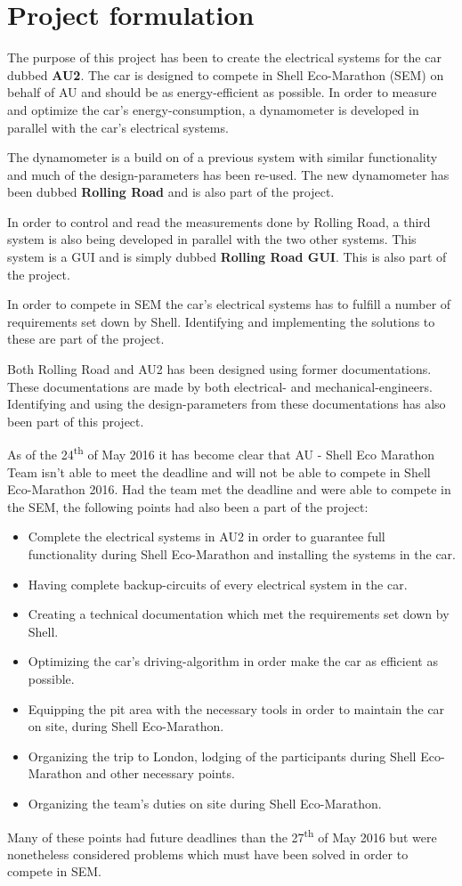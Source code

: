 \chapter{Project formulation}
The purpose of this project has been to create the electrical systems for the car dubbed \textbf{AU2}. The car is designed to compete in Shell Eco-Marathon (SEM) on behalf of AU and should be as energy-efficient as possible. In order to measure and optimize the car's energy-consumption, a dynamometer is developed in parallel with the car's electrical systems. 

The dynamometer is a build on of a previous system with similar functionality\cite{BAC_rullefelt} and much of the design-parameters has been re-used. The new dynamometer has been dubbed \textbf{Rolling Road} and is also part of the project.

In order to control and read the measurements done by Rolling Road, a third system is also being developed in parallel with the two other systems. This system is a GUI and is simply dubbed \textbf{Rolling Road GUI}. This is also part of the project.

In order to compete in SEM the car's electrical systems has to fulfill a number of requirements set down by Shell. Identifying and implementing the solutions to these are part of the project.

Both Rolling Road and AU2 has been designed using former documentations. These documentations are made by both electrical- and mechanical-engineers. Identifying and using the design-parameters from these documentations has also been part of this project.

As of the 24\textsuperscript{th} of May 2016 it has become clear that AU - Shell Eco Marathon Team isn't able to meet the deadline and will not be able to compete in Shell Eco-Marathon 2016. Had the team met the deadline and were able to compete in the SEM, the following points had also been a part of the project:
\begin{itemize}
	\item Complete the electrical systems in AU2 in order to guarantee full functionality during Shell Eco-Marathon and installing the systems in the car.
	\item Having complete backup-circuits of every electrical system in the car.
	\item Creating a technical documentation which met the requirements set down by Shell.
	\item Optimizing the car's driving-algorithm in order make the car as efficient as possible.
	\item Equipping the pit area with the necessary tools in order to maintain the car on site, during Shell Eco-Marathon.
	\item Organizing the trip to London, lodging of the participants during Shell Eco-Marathon and other necessary points.
	\item Organizing the team's duties on site during Shell Eco-Marathon.
\end{itemize}
Many of these points had future deadlines than the 27\textsuperscript{th} of May 2016 but were nonetheless considered problems which must have been solved in order to compete in SEM.
